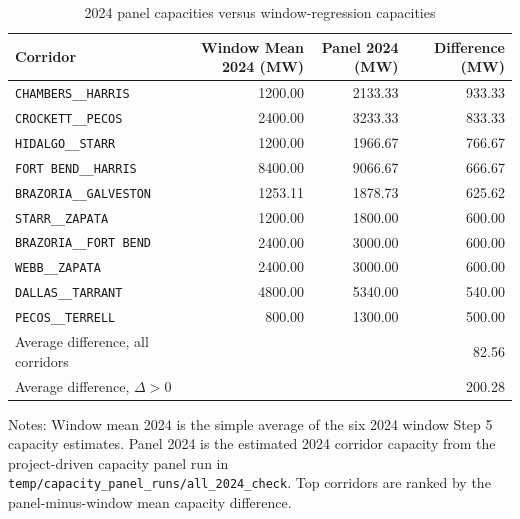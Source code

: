 \begin{table}[htbp]
\centering
\caption{2024 panel capacities versus window-regression capacities}
\label{tab:panel-2024-capacity-comparison}
\begin{tabular}{lrrr}
\toprule
Corridor & Window Mean 2024 (MW) & Panel 2024 (MW) & Difference (MW) \\
\midrule
\texttt{CHAMBERS\_\_HARRIS} & 1200.00 & 2133.33 & 933.33 \\
\texttt{CROCKETT\_\_PECOS} & 2400.00 & 3233.33 & 833.33 \\
\texttt{HIDALGO\_\_STARR} & 1200.00 & 1966.67 & 766.67 \\
\texttt{FORT BEND\_\_HARRIS} & 8400.00 & 9066.67 & 666.67 \\
\texttt{BRAZORIA\_\_GALVESTON} & 1253.11 & 1878.73 & 625.62 \\
\texttt{STARR\_\_ZAPATA} & 1200.00 & 1800.00 & 600.00 \\
\texttt{BRAZORIA\_\_FORT BEND} & 2400.00 & 3000.00 & 600.00 \\
\texttt{WEBB\_\_ZAPATA} & 2400.00 & 3000.00 & 600.00 \\
\texttt{DALLAS\_\_TARRANT} & 4800.00 & 5340.00 & 540.00 \\
\texttt{PECOS\_\_TERRELL} & 800.00 & 1300.00 & 500.00 \\
\midrule
Average difference, all corridors &  &  & 82.56 \\
Average difference, $\Delta > 0$ &  &  & 200.28 \\
\bottomrule
\end{tabular}
\vspace{0.5em}
\begin{minipage}{0.92\linewidth}
\footnotesize Notes: Window mean 2024 is the simple average of the six 2024 window Step 5 capacity estimates. Panel 2024 is the estimated 2024 corridor capacity from the project-driven capacity panel run in \texttt{temp/capacity\_panel\_runs/all\_2024\_check}. Top corridors are ranked by the panel-minus-window mean capacity difference.
\end{minipage}
\end{table}
